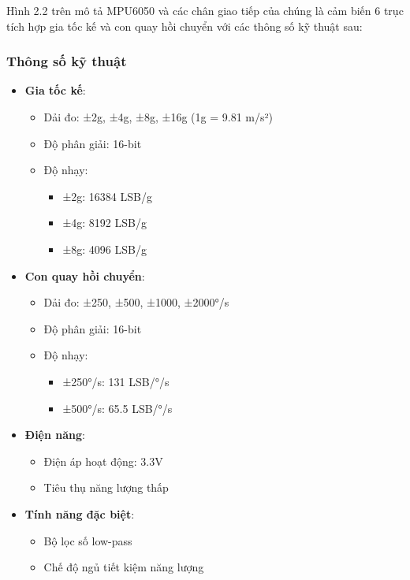 \documentclass[a4paper,12pt]{report}
\begin{document}
	Hình 2.2 trên mô tả MPU6050 và các chân giao tiếp của chúng là cảm biến 6 trục tích hợp gia tốc kế và con quay hồi chuyển với các thông số kỹ thuật sau:
	
	\subsubsection{Thông số kỹ thuật}
	\begin{itemize}
		\item \textbf{Gia tốc kế}:
		\begin{itemize}
			\item Dải đo: ±2g, ±4g, ±8g, ±16g (1g = 9.81 m/s²)
			\item Độ phân giải: 16-bit
			\item Độ nhạy:
			\begin{itemize}
				\item ±2g: 16384 LSB/g
				\item ±4g: 8192 LSB/g
				\item ±8g: 4096 LSB/g
			\end{itemize}
		\end{itemize}
		
		\item \textbf{Con quay hồi chuyển}:
		\begin{itemize}
			\item Dải đo: ±250, ±500, ±1000, ±2000°/s
			\item Độ phân giải: 16-bit
			\item Độ nhạy:
			\begin{itemize}
				\item ±250°/s: 131 LSB/°/s
				\item ±500°/s: 65.5 LSB/°/s
			\end{itemize}
		\end{itemize}
		
		\item \textbf{Điện năng}:
		\begin{itemize}
			\item Điện áp hoạt động: 3.3V
			\item Tiêu thụ năng lượng thấp
		\end{itemize}
		
		\item \textbf{Tính năng đặc biệt}:
		\begin{itemize}
			\item Bộ lọc số low-pass
			\item Chế độ ngủ tiết kiệm năng lượng
		\end{itemize}
	\end{itemize}
	
\end{document}
